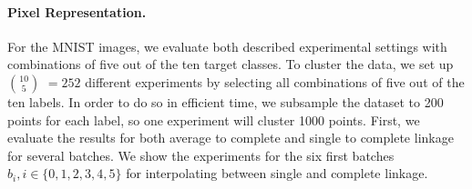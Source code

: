 \paragraph{Pixel Representation.} For the MNIST images, we evaluate both described experimental settings with combinations of five out of the ten target classes. To cluster the data, we set up $10 \choose 5$ $= 252$ different experiments by selecting all combinations of five out of the ten labels. In order to do so in efficient time, we subsample the dataset to 200 points for each label, so one experiment will cluster 1000 points. First, we evaluate the results for both average to complete and single to complete linkage for several batches. We show the experiments for the six first batches $b_i, i \in \{0, 1, 2, 3, 4, 5\}$ for interpolating between single and complete linkage.

